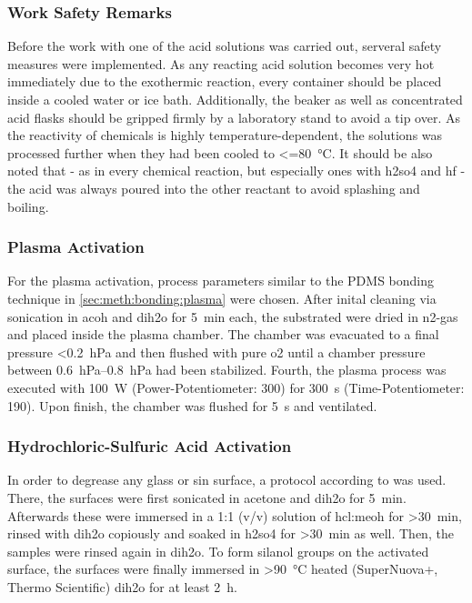 \subsubsection{Work Safety Remarks}
Before the work with one of the acid solutions was carried out, serveral safety measures were implemented. As any reacting acid solution becomes very hot immediately due to the exothermic reaction, every container should be placed inside a cooled water or ice bath. Additionally, the beaker as well as concentrated acid flasks should be gripped firmly by a laboratory stand to avoid a tip over. As the reactivity of chemicals is highly temperature-dependent, the solutions was processed further when they had been cooled to \SI{<=80}{\degreeCelsius}. It should be also noted that - as in every chemical reaction, but especially ones with \gls{h2so4} and \gls{hf} - the acid was always poured into the other reactant to avoid splashing and boiling.

\subsubsection{Plasma Activation}
For the plasma activation, process parameters similar to the PDMS bonding technique in \ref{sec:meth:bonding:plasma} were chosen. After inital cleaning via sonication in \gls{acoh} and \gls{dih2o} for \SI{5}{\minute} each, the substrated were dried in \gls{n2}-gas and placed inside the plasma chamber. The chamber was evacuated to a final pressure <\SI{0.2}{\hecto\pascal} and then flushed with pure \gls{o2} until a chamber pressure between \SIrange{0.6}{0.8}{\hecto\pascal} had been stabilized. Fourth, the plasma process was executed with \SI{100}{\watt} (Power-Potentiometer: \num{300}) for \SI{300}{\second} (Time-Potentiometer: \num{190}). Upon finish, the chamber was flushed for \SI{5}{\second} and ventilated.

\subsubsection{Hydrochloric-Sulfuric Acid Activation}
In order to degrease any glass or \gls{sin} surface, a protocol according to \citet{lit:chem:Dressick} was used. There, the surfaces were first sonicated in acetone and \gls{dih2o}  for \SI{5}{\minute}. Afterwards these were immersed in a 1:1 (v/v) solution of \gls{hcl}:\gls{meoh} for \SI{>30}{\minute}, rinsed with \gls{dih2o} copiously and soaked in \gls{h2so4} for \SI{>30}{\minute} as well. Then, the samples were rinsed again in \acrlong{dih2o}. To form silanol groups on the activated surface, the surfaces were finally immersed in \SI{>90}{\degreeCelsius} heated (SuperNuova+, Thermo Scientific) \gls{dih2o}  for at least \SI{2}{\hour}.
